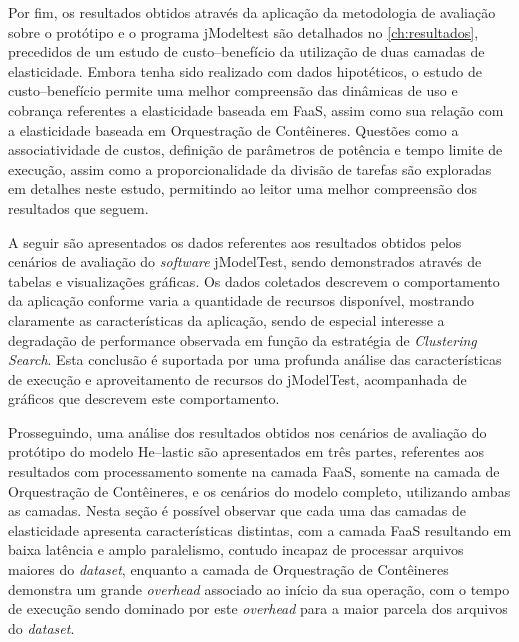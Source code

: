 \documentclass[english,brazilian]{UNISINOSmonografia} %
\begin{document}

Por fim, os resultados obtidos através da aplicação da metodologia de avaliação sobre o protótipo e o programa jModeltest são detalhados no \autoref{ch:resultados}, precedidos de um estudo de custo--benefício da utilização de duas camadas de elasticidade.
%
Embora tenha sido realizado com dados hipotéticos, o estudo de custo--benefício permite uma melhor compreensão das dinâmicas de uso e cobrança referentes a elasticidade baseada em FaaS, assim como sua relação com a elasticidade baseada em Orquestração de Contêineres.
%
Questões como a associatividade de custos, definição de parâmetros de potência e tempo limite de execução, assim como a proporcionalidade da divisão de tarefas são exploradas em detalhes neste estudo, permitindo ao leitor uma melhor compreensão dos resultados que seguem.



A seguir são apresentados os dados referentes aos resultados obtidos pelos cenários de avaliação do \textit{software} jModelTest, sendo demonstrados através de tabelas e visualizações gráficas.
%
Os dados coletados descrevem o comportamento da aplicação conforme varia a quantidade de recursos disponível, mostrando claramente as características da aplicação, sendo de especial interesse a degradação de performance observada em função da estratégia de \textit{Clustering Search}.
%
Esta conclusão é suportada por uma profunda análise das características de execução e aproveitamento de recursos do jModelTest, acompanhada de gráficos que descrevem este comportamento.



Prosseguindo, uma análise dos resultados obtidos nos cenários de avaliação do protótipo do modelo \textsf{He}--lastic são apresentados em três partes, referentes aos resultados com processamento somente na camada FaaS, somente na camada de Orquestração de Contêineres, e os cenários do modelo completo, utilizando ambas as camadas.
%
Nesta seção é possível observar que cada uma das camadas de elasticidade apresenta características distintas, com a camada FaaS resultando em baixa latência e amplo paralelismo, contudo incapaz de processar arquivos maiores do \textit{dataset}, enquanto a camada de Orquestração de Contêineres demonstra um grande \textit{overhead} associado ao início da sua operação, com o tempo de execução sendo dominado por este \textit{overhead} para a maior parcela dos arquivos do \textit{dataset}.
\end{document}
